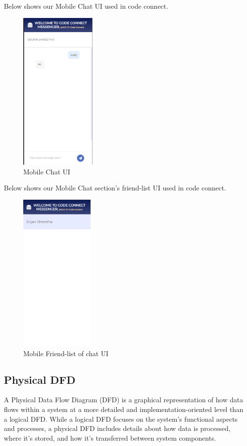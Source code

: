 \newpage
Below shows our Mobile Chat UI used in code connect.
\begin{figure}[H]
  \centering
  \includegraphics[height = 8cm]{Outcome-ss/mobile-chat.png}
  \caption{Mobile Chat UI}
\end{figure}

Below shows our Mobile Chat section's friend-list UI used in code connect.
\begin{figure}[H]
  \centering
  \includegraphics[height = 8cm]{Outcome-ss/moble-chat-friends.png}
  \caption{Mobile Friend-list of chat UI}
\end{figure}

\subsection{Physical DFD}
A Physical Data Flow Diagram (DFD) is a graphical representation of how data flows within a system at a more detailed and implementation-oriented level than a logical DFD. While a logical DFD focuses on the system's functional aspects and processes, a physical DFD includes details about how data is processed, where it's stored, and how it's transferred between system components.

